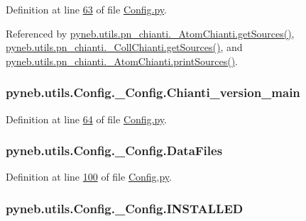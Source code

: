 Definition at line \hyperlink{_config_8py_source_l00063}{63} of file \hyperlink{_config_8py_source}{Config.\-py}.



Referenced by \hyperlink{pn__chianti_8py_source_l00393}{pyneb.\-utils.\-pn\-\_\-chianti.\-\_\-\-Atom\-Chianti.\-get\-Sources()}, \hyperlink{pn__chianti_8py_source_l00570}{pyneb.\-utils.\-pn\-\_\-chianti.\-\_\-\-Coll\-Chianti.\-get\-Sources()}, and \hyperlink{pn__chianti_8py_source_l00404}{pyneb.\-utils.\-pn\-\_\-chianti.\-\_\-\-Atom\-Chianti.\-print\-Sources()}.

\hypertarget{classpyneb_1_1utils_1_1_config_1_1___config_a13c8a6fbaf136ebfd98cc8c62d1cf05f}{
\subsubsection[{Chianti\-\_\-version\-\_\-main}]{\setlength{\rightskip}{0pt plus 5cm}pyneb.\-utils.\-Config.\-\_\-\-Config.\-Chianti\-\_\-version\-\_\-main}}\label{classpyneb_1_1utils_1_1_config_1_1___config_a13c8a6fbaf136ebfd98cc8c62d1cf05f}


Definition at line \hyperlink{_config_8py_source_l00064}{64} of file \hyperlink{_config_8py_source}{Config.\-py}.

\hypertarget{classpyneb_1_1utils_1_1_config_1_1___config_ab6b6d2b4a7046e65edca2cf9f92be911}{
\subsubsection[{Data\-Files}]{\setlength{\rightskip}{0pt plus 5cm}pyneb.\-utils.\-Config.\-\_\-\-Config.\-Data\-Files}}\label{classpyneb_1_1utils_1_1_config_1_1___config_ab6b6d2b4a7046e65edca2cf9f92be911}


Definition at line \hyperlink{_config_8py_source_l00100}{100} of file \hyperlink{_config_8py_source}{Config.\-py}.

\hypertarget{classpyneb_1_1utils_1_1_config_1_1___config_ae07a752629612175b8000d374904b22a}{
\subsubsection[{I\-N\-S\-T\-A\-L\-L\-E\-D}]{\setlength{\rightskip}{0pt plus 5cm}pyneb.\-utils.\-Config.\-\_\-\-Config.\-I\-N\-S\-T\-A\-L\-L\-E\-D}}\label{classpyneb_1_1utils_1_1_config_1_1___config_ae07a752629612175b8000d374904b22a}


